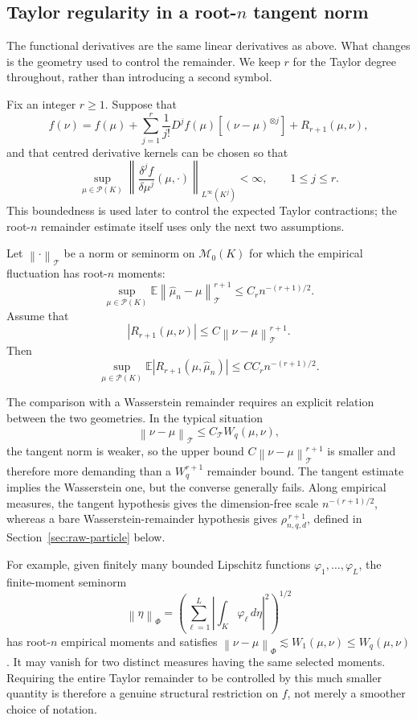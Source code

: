 \documentclass[11pt]{article}
\newcommand{\Pcal}{\mathcal P}
\newcommand{\Mcal}{\mathcal M}
\newcommand{\E}{\mathbb E}
\newcommand{\norm}[1]{\left\lVert #1\right\rVert}
\begin{document}
\subsection{Taylor regularity in a root-\(n\) tangent norm}
\label{sec:root-n-taylor}

The functional derivatives are the same linear derivatives as above.
What changes is the geometry used to control the remainder. We keep
\(r\) for the Taylor degree throughout, rather than introducing a
second symbol.

Fix an integer \(r\geq1\). Suppose that
\[
f(\nu)
=
f(\mu)
+
\sum_{j=1}^{r}
\frac1{j!}
D^jf(\mu)
\left[(\nu-\mu)^{\otimes j}\right]
+
R_{r+1}(\mu,\nu),
\]
and that centred derivative kernels can be chosen so that
\[
\sup_{\mu\in\Pcal(K)}
\norm{
\frac{\delta^j f}{\delta\mu^j}(\mu,\cdot)
}_{L^\infty(K^j)}
<\infty,
\qquad 1\leq j\leq r.
\]
This boundedness is used later to control the expected Taylor
contractions; the root-\(n\) remainder estimate itself uses only the
next two assumptions.

Let \(\norm{\cdot}_{\mathcal T}\) be a norm or seminorm on
\(\Mcal_0(K)\) for which the empirical fluctuation has root-\(n\)
moments:
\[
\sup_{\mu\in\Pcal(K)}
\E\norm{\widehat\mu_n-\mu}_{\mathcal T}^{r+1}
\leq
C_r n^{-(r+1)/2}.
\]
Assume that
\[
|R_{r+1}(\mu,\nu)|
\leq
C\norm{\nu-\mu}_{\mathcal T}^{r+1}.
\]
Then
\[
\sup_{\mu\in\Pcal(K)}
\E|R_{r+1}(\mu,\widehat\mu_n)|
\leq
CC_r n^{-(r+1)/2}.
\]

The comparison with a Wasserstein remainder requires an explicit
relation between the two geometries. In the typical situation
\[
\norm{\nu-\mu}_{\mathcal T}
\leq C_{\mathcal T}W_q(\mu,\nu),
\]
the tangent norm is weaker, so the upper bound
\(C\norm{\nu-\mu}_{\mathcal T}^{r+1}\) is smaller and therefore more
demanding than a \(W_q^{r+1}\) remainder bound. The tangent estimate
implies the Wasserstein one, but the converse generally fails. Along
empirical measures, the tangent hypothesis gives the dimension-free
scale \(n^{-(r+1)/2}\), whereas a bare Wasserstein-remainder hypothesis
gives \(\rho_{n,q,d}^{\,r+1}\), defined in
Section~\ref{sec:raw-particle} below.

For example, given finitely many bounded Lipschitz functions
\(\varphi_1,\ldots,\varphi_L\), the finite-moment seminorm
\[
\norm{\eta}_{\Phi}
=
\left(
\sum_{\ell=1}^L
\left|\int_K\varphi_\ell\,d\eta\right|^2
\right)^{1/2}
\]
has root-\(n\) empirical moments and satisfies
\(\norm{\nu-\mu}_{\Phi}\lesssim W_1(\mu,\nu)\leq W_q(\mu,\nu)\).
It may vanish for two distinct measures having the same selected
moments. Requiring the entire Taylor remainder to be controlled by this
much smaller quantity is therefore a genuine structural restriction on
\(f\), not merely a smoother choice of notation.
\end{document}
